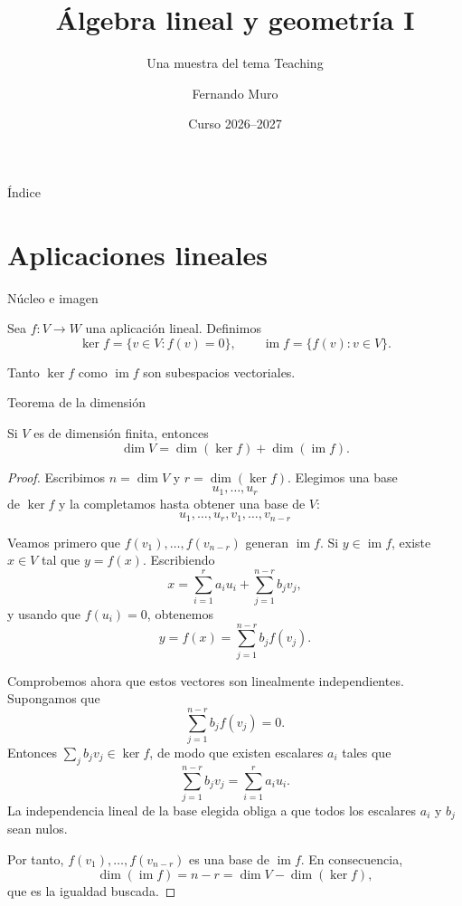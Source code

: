 \documentclass[aspectratio=169,11pt]{beamer}
\title[Álgebra lineal]{Álgebra lineal y geometría I}
\subtitle{Una muestra del tema Teaching}
\author[F. Muro]{Fernando Muro}
\institute[US]{Universidad de Sevilla}
\date{Curso 2026--2027}
\begin{document}
\begin{frame}[plain]
  \titlepage
\end{frame}

\begin{frame}{Índice}
  \tableofcontents
\end{frame}

\section{Aplicaciones lineales}

\begin{frame}{Núcleo e imagen}
  \begin{definition}
    Sea $f\colon V\to W$ una aplicación lineal. Definimos
    \[
      \ker f=\{v\in V:f(v)=0\},
      \qquad
      \operatorname{im}f=\{f(v):v\in V\}.
    \]
  \end{definition}

  \begin{proposition}
    Tanto $\ker f$ como $\operatorname{im}f$ son subespacios vectoriales.
  \end{proposition}
\end{frame}

\begin{frame}[allowframebreaks]{Teorema de la dimensión}
  \begin{theorem}
    Si $V$ es de dimensión finita, entonces
    \[
      \dim V=\dim(\ker f)+\dim(\operatorname{im}f).
    \]
  \end{theorem}

  \begin{proof}
    Escribimos $n=\dim V$ y $r=\dim(\ker f)$. Elegimos una base
    \[
      u_1,\dots,u_r
    \]
    de $\ker f$ y la completamos hasta obtener una base de $V$:
    \[
      u_1,\dots,u_r,v_1,\dots,v_{n-r}
    \]

    Veamos primero que $f(v_1),\dots,f(v_{n-r})$ generan
    $\operatorname{im}f$. Si $y\in\operatorname{im}f$, existe $x\in V$ tal
    que $y=f(x)$. Escribiendo
    \[
      x=\sum_{i=1}^r a_i u_i+
        \sum_{j=1}^{n-r}b_jv_j,
    \]
    y usando que $f(u_i)=0$, obtenemos
    \[
      y=f(x)=\sum_{j=1}^{n-r}b_jf(v_j).
    \]

    Comprobemos ahora que estos vectores son linealmente independientes.
    Supongamos que
    \[
      \sum_{j=1}^{n-r}b_jf(v_j)=0.
    \]
    Entonces $\sum_jb_jv_j\in\ker f$, de modo que existen escalares $a_i$
    tales que
    \[
      \sum_{j=1}^{n-r}b_jv_j=\sum_{i=1}^r a_i u_i.
    \]
    La independencia lineal de la base elegida obliga a que todos los
    escalares $a_i$ y $b_j$ sean nulos.

    Por tanto, $f(v_1),\dots,f(v_{n-r})$ es una base de
    $\operatorname{im}f$. En consecuencia,
    \[
      \dim(\operatorname{im}f)=n-r
      =\dim V-\dim(\ker f),
    \]
    que es la igualdad buscada.
  \end{proof}
\end{frame}
\end{document}
